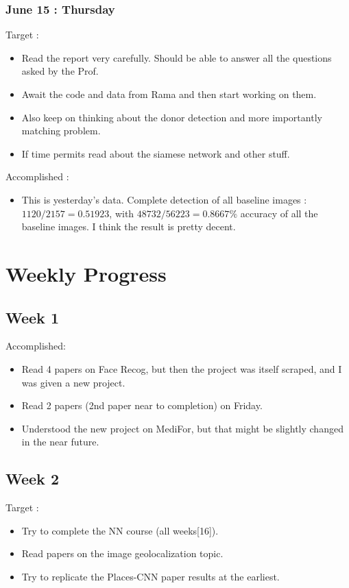 \documentclass{article}
\begin{document}
\subsubsection{June 15 : Thursday}
Target :
\begin{itemize}
\item Read the report very carefully. Should be able to answer all the questions asked by the Prof.
\item Await the code and data from Rama and then start working on them.
\item Also keep on thinking about the donor detection and more importantly matching problem.
\item If time permits read about the siamese network and other stuff.
\end{itemize}

Accomplished :
\begin{itemize}
\item This is yesterday's data. Complete detection of all baseline images : $1120/2157 = 0.51923$, with $48732/56223 = 0.8667\%$ accuracy of all the baseline images. I think the result is pretty decent.
\end{itemize}
\section{Weekly Progress}
\subsection{Week 1}
Accomplished:
\begin{itemize}
\item Read 4 papers on Face Recog, but then the project was itself scraped, and I was given a new project.
\item Read 2 papers (2nd paper near to completion) on Friday.
\item Understood the new project on MediFor, but that might be slightly changed in the near future.
\end{itemize}


\subsection{Week 2}
Target :
\begin{itemize}
\item Try to complete the NN course (all weeks[16]).
\item Read papers on the image geolocalization topic.
\item Try to replicate the Places-CNN paper results at the earliest.
\end{itemize}
\end{document}
